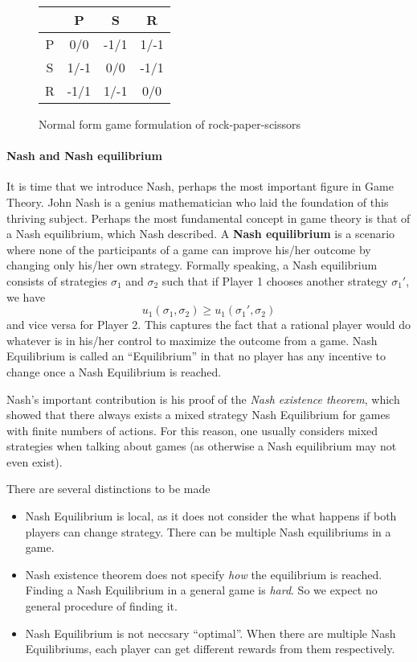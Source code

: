 \documentclass[10pt,a4paper]{article}
\begin{document}
\begin{figure}[ht]
  \centering
  \begin{tabular}{|c|c|c|c|}
    \hline
      & P    & S    & R    \\ \hline
    P & 0/0  & -1/1 & 1/-1 \\ \hline
    S & 1/-1 & 0/0  & -1/1 \\ \hline
    R & -1/1 & 1/-1 & 0/0  \\ \hline
  \end{tabular}
  \caption{Normal form game formulation of rock-paper-scissors}
  \label{figure:RPS}
\end{figure}

\paragraph{Nash and Nash equilibrium}
It is time that we introduce Nash, perhaps the most important figure in Game Theory. John Nash is a genius mathematician who laid the foundation of this thriving subject.  Perhaps the most fundamental concept in game theory is that of a Nash equilibrium, which Nash described. A \textbf{Nash equilibrium} is a scenario where none of the participants of a game can improve his/her outcome by changing only his/her own strategy. Formally speaking, a Nash equilibrium consists of strategies $\sigma_1$ and $\sigma_2$ such that if Player 1 chooses another strategy $\sigma_1'$, we have
$$
  u_1(\sigma_1, \sigma_2) \geq u_1(\sigma_1', \sigma_2)
$$
and vice versa for Player 2. This captures the fact that a rational player would do whatever is in his/her control to maximize the outcome from a game. Nash Equilibrium is called an ``Equilibrium'' in that no player has any incentive to change once a Nash Equilibrium is reached. 

Nash's important contribution is his proof of the \textit{Nash existence theorem}, which showed that there always exists a mixed strategy Nash Equilibrium for games with finite numbers of actions. For this reason, one usually considers mixed strategies when talking about games (as otherwise a Nash equilibrium may not even exist). 

There are several distinctions to be made
\begin{itemize}
\item Nash Equilibrium is local, as it does not consider the what happens if both players can change strategy. There can be multiple Nash equilibriums in a game.
\item Nash existence theorem does not specify \textit{how} the equilibrium is reached. Finding a Nash Equilibrium in a general game is \textit{hard}. So we expect no general procedure of finding it.
\item Nash Equilibrium is not neccsary ``optimal''. When there are multiple Nash Equilibriums, each player can get different rewards from them respectively.
\end{itemize}
\end{document}
